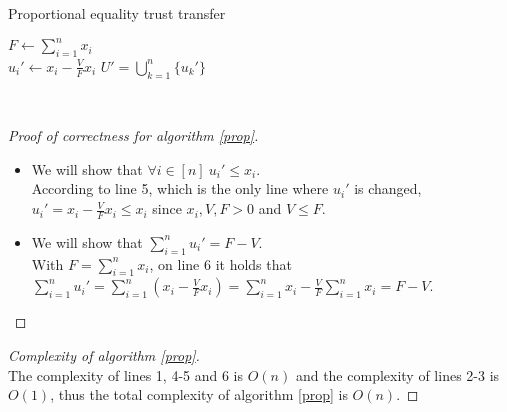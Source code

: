\documentclass[11pt]{article}
\theoremstyle{definition}
\theoremstyle{corollary}
\theoremstyle{lemma}
\begin{document}
    \begin{algorithm}[H]
       \label{prop}
       \caption{Proportional equality trust transfer}
       $F \gets \sum\limits_{i=1}^{n}x_i$ \\
          {$u_i' \gets x_i - \frac{V}{F} x_i$}
       \Return $U' = \bigcup\limits_{k=1}^{n}\{u_k'\}$
    \end{algorithm} \ \\
    \begin{proof}[Proof of correctness for algorithm \ref{prop}] \
       \begin{itemize}
          \item We will show that $\forall i \in [n] \: u_i' \leq x_i$. \\
          According to line 5, which is the only line where $u_i'$ is changed, $u_i' = x_i - \frac{V}{F}x_i \leq x_i$
          since $x_i, V, F > 0$ and $V \leq F$.
          \item We will show that $\sum\limits_{i=1}^{n}u_i' = F - V$. \\
          With $F = \sum\limits_{i=1}^{n}x_i$, on line 6 it holds that $\sum\limits_{i=1}^{n}u_i' = \sum\limits_{i=1}^{n}
          (x_i - \frac{V}{F}x_i) = \sum\limits_{i=1}^{n}x_i - \frac{V}{F}\sum\limits_{i=1}^{n}x_i = F - V$.
       \end{itemize}
    \end{proof}
    \begin{proof}[Complexity of algorithm \ref{prop}] \ \\
       The complexity of lines 1, 4-5 and 6 is $O(n)$ and the complexity of lines 2-3 is $O(1)$, thus the total complexity
       of algorithm \ref{prop} is $O(n)$.
    \end{proof}
\end{document}
